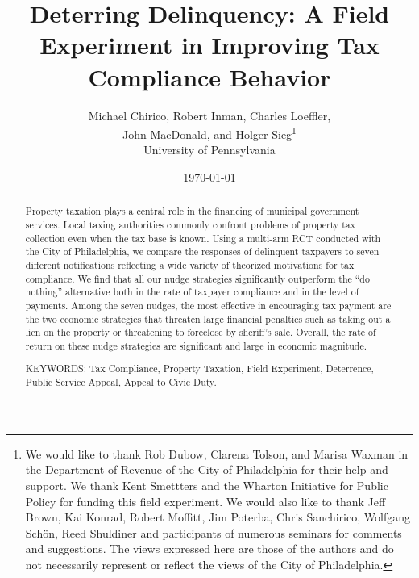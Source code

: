 \documentclass[12pt]{article}
\renewcommand{\thefootnote}{\fnsymbol{footnote}}
\begin{document}
\title{Deterring Delinquency: A Field Experiment in Improving Tax Compliance Behavior}

\author{Michael Chirico, Robert Inman, Charles Loeffler, \\ 
John MacDonald, and Holger Sieg\thanks{We would like to thank Rob Dubow,
    Clarena Tolson, and Marisa Waxman in the Department of Revenue of
    the City of Philadelphia for their help and support. We thank Kent
    Smettters and the Wharton Initiative for Public Policy for funding
    this field experiment. We would also like to thank Jeff Brown, Kai
    Konrad, Robert Moffitt, Jim Poterba, Chris Sanchirico, Wolfgang
    Sch\"on, Reed Shuldiner and participants of numerous seminars for
    comments and suggestions. The views expressed here are those of
    the authors and do not necessarily represent or reflect the views
    of the City of Philadelphia.}  \\ 
University of Pennsylvania}

\date{\today}

\maketitle

\begin{abstract}

Property taxation plays a central role in the financing of municipal
government services. Local taxing authorities commonly confront
problems of property tax collection even when the tax base is known.
Using a multi-arm RCT conducted with the City of Philadelphia, we
compare the responses of delinquent taxpayers to seven different
notifications reflecting a wide variety of theorized motivations for
tax compliance. We find that all our nudge strategies significantly
outperform the ``do nothing'' alternative both in the rate of taxpayer
compliance and in the level of payments.  Among the seven nudges, the
most effective in encouraging tax payment are the two economic
strategies that threaten large financial penalties such as taking out
a lien on the property or threatening to foreclose by sheriff's sale.
Overall, the rate of return on these nudge strategies are significant
and large in economic magnitude.

\bigskip

\noindent KEYWORDS: Tax Compliance, Property Taxation, Field
Experiment, Deterrence, Public Service Appeal, Appeal to Civic Duty.

\end{abstract}
\renewcommand{\thefootnote}{\arabic{footnote}}
\end{document}
